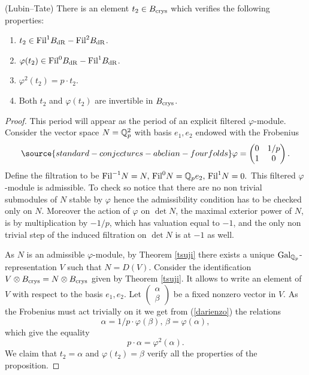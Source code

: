 \begin{prop}
\notready\label{lubintate} (Lubin--Tate)
There is an element $t_2 \in B_{\textnormal{crys}}$ which verifies the following properties:
\begin{enumerate}
\item $t_2 \in \textnormal{Fil} ^{1} B_{\mathrm{dR}}-\textnormal{Fil} ^{2} B_{\mathrm{dR}}$.
\item  $ \varphi(t_2) \in \textnormal{Fil} ^{0} B_{\mathrm{dR}}-\textnormal{Fil} ^{1} B_{\mathrm{dR}}$.
\item $\varphi^2(t_2) = p \cdot t_2$.
\item Both $t_2 $ and  $ \varphi(t_2) $ are invertible in $B_{\textnormal{crys}}$.
\end{enumerate}
\end{prop}
\begin{proof}
This period will appear as the period of an explicit filtered $\varphi$-module. Consider the vector space  $N=\mathbb{Q}_p^2$ with basis $e_1,e_2$ endowed with the Frobenius
\begin{equation}\label{darienzo}
\source{standard-conjectures-abelian-fourfolds}
\varphi =  \begin{pmatrix} 0 & 1/p \\
1 & 0
 \end{pmatrix}.
 \end{equation}
 Define the filtration to be $\textnormal{Fil}^{-1} N=N, \, \textnormal{Fil}^0 N= \mathbb{Q}_p e_2, \, \textnormal{Fil}^{1} N=0.$ This filtered $\varphi$-module is admissible. To check so notice that there are no non trivial submodules of $N$ stable by $\varphi$ hence the admissibility condition has to be checked only on $N$.
 Moreover the action of $\varphi$ on $\det N$, the maximal exterior power of $N$, is by multiplication by $-1/p$, which has valuation equal to $-1$, and the only non trivial step of the induced filtration on $\det N$ is at $-1$ as well.

 As $N$ is an admissible $\varphi$-module, by Theorem \ref{tsuji} there exists a unique $\textnormal{Gal}_{\mathbb{Q}_p}$-representation $V$ such that $N=D(V)$.
 Consider the identification $V \otimes B_{\textnormal{crys}}= N \otimes B_{\textnormal{crys}}$ given by  Theorem \ref{tsuji}. It allows to write an element of $V$ with respect to the basis $e_1,e_2$. Let $\begin{pmatrix} \alpha \\
\beta
 \end{pmatrix}$ be a fixed nonzero vector in $V$. As the Frobenius must act trivially on it we get from (\ref{darienzo})  the relations
 \[ \alpha= 1/p \cdot \varphi(\beta),\,
    \beta= \varphi(\alpha),\]
  which give the equality
  \[ p \cdot \alpha=  \varphi^2(\alpha).\]
  We claim that $t_2= \alpha$ and $\varphi(t_2)= \beta$ verify all the properties of the proposition.


\end{proof}
